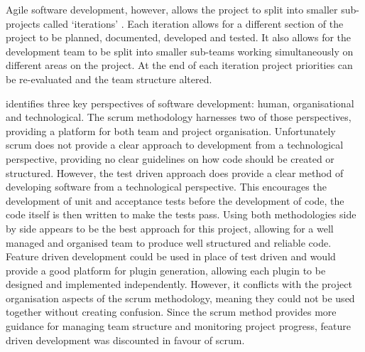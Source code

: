 \documentclass[10pt,a4paper]{article}
\begin{document}
Agile software development, however, allows the project to split into smaller
sub-projects called `iterations' \cite{hazzan2008agile}. Each iteration allows
for a different section of the project to be planned, documented, developed and
tested. It also allows for the development team to be split into smaller
sub-teams working simultaneously on different areas on the project. At the end
of each iteration project priorities can be re-evaluated and the team structure
altered. 

\cite{hazzan2008agile} identifies three key perspectives of software
development: human, organisational and technological. The scrum methodology
harnesses two of those perspectives, providing a platform for both team and
project organisation. Unfortunately scrum does not provide a clear approach to
development from a technological perspective, providing no clear guidelines on
how code should be created or structured. However, the test driven approach does
provide a clear method of developing software from a technological perspective.
This encourages the development of unit and acceptance tests before the
development of code, the code itself is then written to make the tests pass.
Using both methodologies side by side appears to be the best approach for this
project, allowing for a well managed and organised team to produce well
structured and reliable code. Feature driven development could be used in place
of test driven and would provide a good platform for plugin generation, allowing
each plugin to be designed and implemented independently. However, it conflicts
with the project organisation aspects of the scrum methodology, meaning they
could not be used together without creating confusion. Since the scrum method
provides more guidance for managing team structure and monitoring project
progress, feature driven development was discounted in favour of scrum.
\end{document}

